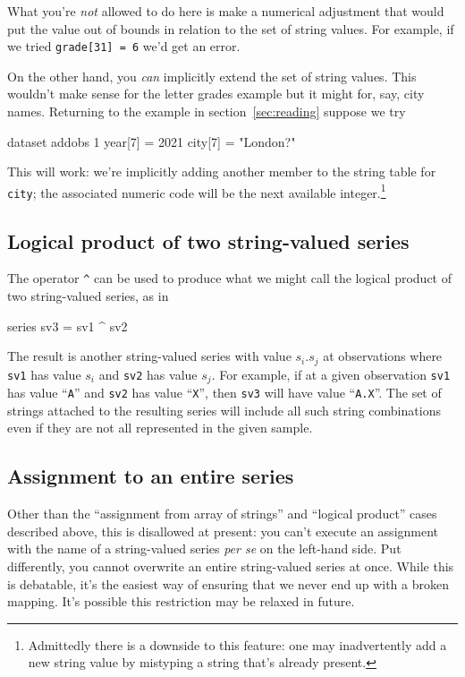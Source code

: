 What you're \textit{not} allowed to do here is make a numerical
adjustment that would put the value out of bounds in relation to the
set of string values. For example, if we tried \texttt{grade[31] = 6}
we'd get an error. 

On the other hand, you \textit{can} implicitly extend the set of
string values. This wouldn't make sense for the letter grades example
but it might for, say, city names. Returning to the example in
section~\ref{sec:reading} suppose we try
%
\begin{code}
dataset addobs 1
year[7] = 2021
city[7] = "London?"
\end{code}
%
This will work: we're implicitly adding another member to the string
table for \texttt{city}; the associated numeric code will be the next
available integer.\footnote{Admittedly there is a downside to this
  feature: one may inadvertently add a new string value by mistyping a
  string that's already present.}

\subsection{Logical product of two string-valued series}

The operator \verb|^| can be used to produce what we might call the
logical product of two string-valued series, as in
\begin{code}
series sv3 = sv1 ^ sv2
\end{code}
The result is another string-valued series with value $s_i.s_j$ at
observations where \texttt{sv1} has value $s_i$ and \texttt{sv2} has
value $s_j$. For example, if at a given observation \texttt{sv1} has
value ``\texttt{A}'' and \texttt{sv2} has value ``\texttt{X}'', then
\texttt{sv3} will have value ``\texttt{A.X}''. The set of strings
attached to the resulting series will include all such string
combinations even if they are not all represented in the given sample.

\subsection{Assignment to an entire series}

Other than the ``assignment from array of strings'' and ``logical
product'' cases described above, this is disallowed at present: you
can't execute an assignment with the name of a string-valued series
\textit{per se} on the left-hand side. Put differently, you cannot
overwrite an entire string-valued series at once. While this is
debatable, it's the easiest way of ensuring that we never end up with
a broken mapping. It's possible this restriction may be relaxed in
future.

